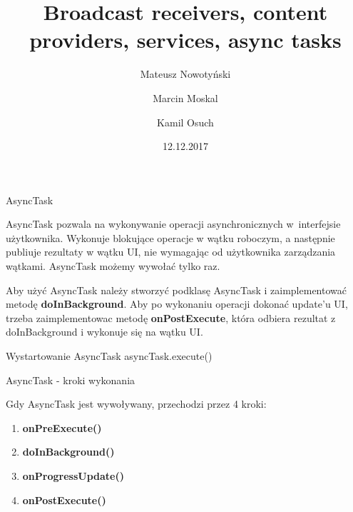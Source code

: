 \documentclass{beamer}
\title[Technologie mobilne]{Broadcast receivers, content providers, services, async tasks}
\author[M. Nowotyński, M.Moskal, K. Osuch]{Mateusz Nowotyński \and Marcin Moskal \and Kamil Osuch}
\date[12.12.2017]{12.12.2017}
\begin{document}
{
 \begin{frame}
   \titlepage
 \end{frame}
}


\begin{frame}{AsyncTask}
	\begin{block}{}
		AsyncTask pozwala na wykonywanie operacji asynchronicznych w~interfejsie użytkownika. Wykonuje blokujące operacje w wątku roboczym, a następnie publiuje rezultaty w wątku UI, nie wymagając od użytkownika zarządzania wątkami. AsyncTask możemy wywołać tylko raz.
	\end{block}
	
	\begin{block}{}
		Aby użyć AsyncTask należy stworzyć podklasę AsyncTask i zaimplementować metodę \textbf{doInBackground}. Aby po wykonaniu operacji dokonać update'u UI, trzeba zaimplementowac metodę \textbf{onPostExecute}, która odbiera rezultat z doInBackground i wykonuje się na wątku UI.
	\end{block}
	
	\begin{block}{Wystartowanie AsyncTask}
		asyncTask.execute()
	\end{block}
\end{frame}

\begin{frame}{AsyncTask - kroki wykonania}
	\begin{block}{}
		Gdy AsyncTask jest wywoływany, przechodzi przez 4 kroki:
		\begin{enumerate}
			\item \textbf{onPreExecute()}
			\item \textbf{doInBackground()}
			\item \textbf{onProgressUpdate()}
			\item \textbf{onPostExecute()}
		\end{enumerate}
	\end{block}
\end{frame}
\end{document}
